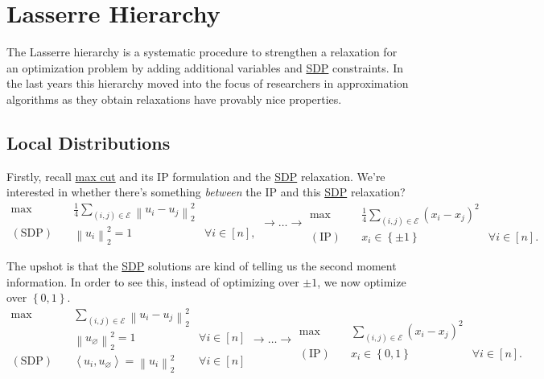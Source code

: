 \section{Lasserre Hierarchy}
The Lasserre hierarchy is a systematic procedure to strengthen a relaxation for an optimization problem by adding additional variables and \hyperref[def:SDP]{SDP} constraints. In the last years this hierarchy moved into the focus of researchers in approximation algorithms as they obtain relaxations have provably nice properties.

\subsection{Local Distributions}
Firstly, recall \hyperref[prb:max-cut]{max cut} and its IP formulation and the \hyperref[def:SDP]{SDP} relaxation. We're interested in whether there's something \emph{between} the IP and this \hyperref[def:SDP]{SDP} relaxation?
\[
	\begin{aligned}
		\max~             & \frac{1}{4} \sum_{(i, j)\in \mathcal{E} } \left\lVert u_i - u_j\right\rVert _2^2                     \\
		(\text{SDP})\quad & \left\lVert u_i\right\rVert _2^2 = 1                                             & \forall i\in [n],
	\end{aligned} \to \dots \to \begin{aligned}
		\max~            & \frac{1}{4} \sum_{(i, j)\in \mathcal{E} }  (x_i - x_j)^{2}                     \\
		(\text{IP})\quad & x_i \in \left\{ \pm 1 \right\}                             & \forall i\in [n].
	\end{aligned}
\]

The upshot is that the \hyperref[def:SDP]{SDP} solutions are kind of telling us the second moment information. In order to see this, instead of optimizing over \(\pm 1\), we now optimize over \(\left\{ 0, 1 \right\} \).
\[
	\begin{aligned}
		\max~             & \sum_{(i, j)\in \mathcal{E} } \left\lVert u_i - u_j\right\rVert _2^2                                   \\
		                  & \left\lVert u_{\varnothing}\right\rVert _2^2 = 1                                    & \forall i\in [n] \\
		(\text{SDP})\quad & \left\langle u_i, u_{\varnothing } \right\rangle = \left\lVert u_i\right\rVert _2^2 & \forall i\in [n]
	\end{aligned} \to \dots \to \begin{aligned}
		\max~            & \sum_{(i, j)\in \mathcal{E} }  (x_i - x_j)^{2}                     \\
		(\text{IP})\quad & x_i \in \left\{ 0, 1 \right\}                  & \forall i\in [n].
	\end{aligned}
\]

